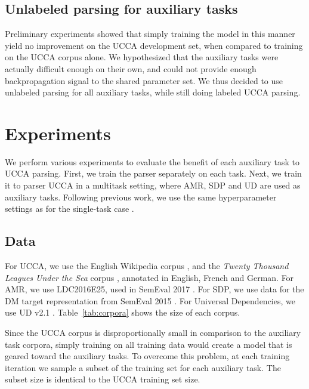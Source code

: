 \documentclass[11pt,a4paper]{article}
\begin{document}
\subsection{Unlabeled parsing for auxiliary tasks}\label{sec:unlabeled_aux}

Preliminary experiments showed that simply training the model in this manner yield no improvement
on the UCCA development set, when compared to training on the UCCA corpus alone.
We hypothesized that the auxiliary tasks were actually difficult enough on their own,
and could not provide enough backpropagation signal to the shared parameter set.
We thus decided to use unlabeled parsing for all auxiliary tasks, while still doing labeled UCCA parsing.


\section{Experiments}\label{sec:experiments}

We perform various experiments to evaluate the benefit of each auxiliary task to UCCA parsing.
First, we train the parser separately on each task.
Next, we train it to parser UCCA in a multitask setting, where AMR, SDP and UD are used as
auxiliary tasks. Following previous work, we use the same hyperparameter settings
as for the single-task case \cite{N16-1179,P16-2038,C16-1013,C16-1059,C16-1179,E17-1005}.

\subsection{Data}\label{sec:data}

For UCCA, we use the English Wikipedia corpus \cite{abend2013universal},
and the \textit{Twenty Thousand Leagues Under the Sea} corpus \cite[20K leagues;][]{sulem2015conceptual},
annotated in English, French and German.
For AMR, we use LDC2016E25, used in SemEval 2017 \cite{may2017semeval}.
For SDP, we use data for the DM target representation from SemEval 2015 \cite{oepen2015semeval}.
For Universal Dependencies, we use UD v2.1 \cite{11234/1-2515}.
Table~\ref{tab:corpora} shows the size of each corpus.

Since the UCCA corpus is disproportionally small in comparison to the auxiliary task corpora,
simply training on all training data would create a model that is geared toward the auxiliary tasks.
To overcome this problem,
at each training iteration we sample a subset of the training set for each auxiliary task.
The subset size is identical to the UCCA training set size.
\end{document}
